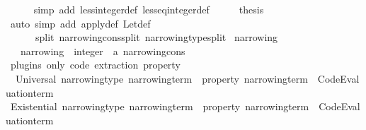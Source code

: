 \begin{isabellebody}
\ \ \ \ \isamarkupfalse%
\ {\isacharparenleft}{\kern0pt}simp\ add{\isacharcolon}{\kern0pt}\ less{\isacharunderscore}{\kern0pt}integer{\isacharunderscore}{\kern0pt}def\ less{\isacharunderscore}{\kern0pt}eq{\isacharunderscore}{\kern0pt}integer{\isacharunderscore}{\kern0pt}def{\isacharparenright}{\kern0pt}\isanewline
\ \ \isamarkupfalse%
\ \isamarkupfalse%
\ {\isacharquery}{\kern0pt}thesis\isanewline
\ \ \ \ \isamarkupfalse%
\ {\isacharparenleft}{\kern0pt}auto\ simp\ add{\isacharcolon}{\kern0pt}\ apply{\isacharunderscore}{\kern0pt}def\ Let{\isacharunderscore}{\kern0pt}def\isanewline
\ \ \ \ \ \ split{\isacharcolon}{\kern0pt}\ narrowing{\isacharunderscore}{\kern0pt}cons{\isachardot}{\kern0pt}split\ narrowing{\isacharunderscore}{\kern0pt}type{\isachardot}{\kern0pt}split{\isacharparenright}{\kern0pt}\isanewline
{}\isamarkupfalse%
%
\endisatagproof
{\isafoldproof}%
%
\isadelimproof
%
\endisadelimproof
%
\isadelimdocument
%
\endisadelimdocument
%
\isatagdocument
%
\isamarkuptrue%
%
\endisatagdocument
{\isafolddocument}%
%
\isadelimdocument
%
\endisadelimdocument
{}\isamarkupfalse%
\ narrowing\ {\isacharequal}{\kern0pt}\isanewline
\ \ \ narrowing\ {\isacharcolon}{\kern0pt}{\isacharcolon}{\kern0pt}\ {\isachardoublequoteopen}integer\ {\isacharequal}{\kern0pt}{\isachargreater}{\kern0pt}\ {\isacharprime}{\kern0pt}a\ narrowing{\isacharunderscore}{\kern0pt}cons{\isachardoublequoteclose}\isanewline
\isanewline
{}\isamarkupfalse%
\ {\isacharparenleft}{\kern0pt}plugins\ only{\isacharcolon}{\kern0pt}\ code\ extraction{\isacharparenright}{\kern0pt}\ property\ {\isacharequal}{\kern0pt}\isanewline
\ \ Universal\ narrowing{\isacharunderscore}{\kern0pt}type\ {\isachardoublequoteopen}{\isacharparenleft}{\kern0pt}narrowing{\isacharunderscore}{\kern0pt}term\ {\isacharequal}{\kern0pt}{\isachargreater}{\kern0pt}\ property{\isacharparenright}{\kern0pt}{\isachardoublequoteclose}\ {\isachardoublequoteopen}narrowing{\isacharunderscore}{\kern0pt}term\ {\isacharequal}{\kern0pt}{\isachargreater}{\kern0pt}\ Code{\isacharunderscore}{\kern0pt}Evaluation{\isachardot}{\kern0pt}term{\isachardoublequoteclose}\isanewline
{\isacharbar}{\kern0pt}\ Existential\ narrowing{\isacharunderscore}{\kern0pt}type\ {\isachardoublequoteopen}{\isacharparenleft}{\kern0pt}narrowing{\isacharunderscore}{\kern0pt}term\ {\isacharequal}{\kern0pt}{\isachargreater}{\kern0pt}\ property{\isacharparenright}{\kern0pt}{\isachardoublequoteclose}\ {\isachardoublequoteopen}narrowing{\isacharunderscore}{\kern0pt}term\ {\isacharequal}{\kern0pt}{\isachargreater}{\kern0pt}\ Code{\isacharunderscore}{\kern0pt}Evaluation{\isachardot}{\kern0pt}term{\isachardoublequoteclose}\isanewline

\end{isabellebody}

